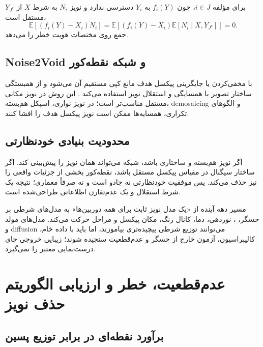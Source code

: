 \documentclass[12pt,openany,oneside]{book}
\newcommand{\E}{\mathbb{E}}
\begin{document}
\begin{proofbox}
برای مؤلفه \(i\in J\)، چون \(f_i(Y)\) به \(Y_i\) دسترسی ندارد و نویز \(N_i\) به شرط \(X\) از
\(Y_{J^c}\) مستقل است،
\begin{equation}
\E[(f_i(Y)-X_i)N_i]
=
\E\left[(f_i(Y)-X_i)\E[N_i\mid X,Y_{J^c}]\right]=0.
\end{equation}
جمع روی مختصات هویت خطر را می‌دهد.
\end{proofbox}

\subsection{Noise2Void و شبکه نقطه‌کور}

 با مخفی‌کردن یا جایگزینی پیکسل هدف مانع کپی مستقیم آن می‌شود و از همبستگی ساختار تصویر با
همسایگی و استقلال نویز استفاده می‌کند \cite{krull2019noise2void}. این روش در نویز مکانی مستقل مناسب‌تر است؛
در نویز نواری، اسپکل هم‌بسته، demosaicing و الگوهای تکراری، همسایه‌ها ممکن است نویز پیکسل هدف را افشا کنند.

\subsection{محدودیت بنیادی خودنظارتی}

اگر نویز هم‌بسته و ساختاری باشد، شبکه می‌تواند همان نویز را پیش‌بینی کند. اگر ساختار سیگنال در مقیاس پیکسل مستقل
باشد، نقطه‌کور بخشی از جزئیات واقعی را نیز حذف می‌کند. پس موفقیت خودنظارتی نه جادو است و نه صرفاً معماری؛ نتیجه
یک شرط استقلال و یک عدم‌تقارن اطلاعاتی طراحی‌شده است.

\begin{futurebox}
مسیر دهه آینده از «یک مدل نویز ثابت برای همه دوربین‌ها» به مدل‌های شرطی بر حسگر، ، نوردهی، دما، کانال رنگ،
مکان پیکسل و مراحل  حرکت می‌کند. مدل‌های مولد و diffusion می‌توانند توزیع شرطی پیچیده‌تری بیاموزند، اما
باید با داده خام، کالیبراسیون، آزمون خارج از حسگر و عدم‌قطعیت سنجیده شوند؛ زیبایی خروجی جای درست‌نمایی معتبر را نمی‌گیرد.
\end{futurebox}

\section{عدم‌قطعیت، خطر و ارزیابی الگوریتم حذف نویز}

\subsection{برآورد نقطه‌ای در برابر توزیع پسین}
\end{document}
